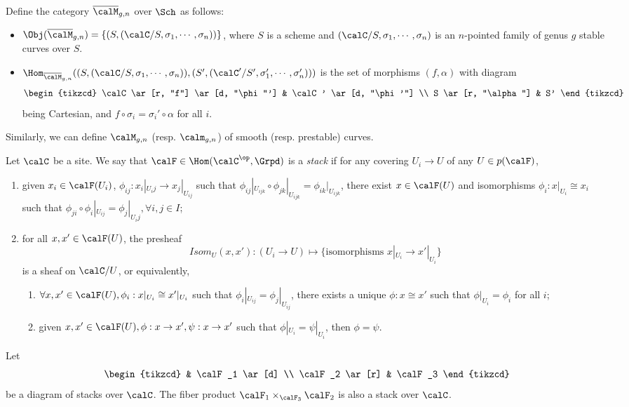     \begin{definition}
        Define the category $\overline{\calM}_{g,n}$ over $\Sch$ as follows:
        \begin{itemize}
            \item \(\Obj(\overline{\calM}_{g,n}) = \{(S, (\calC/S, \sigma_1,\cdots,\sigma_n))\}\), where $S$ is a scheme and $(\calC/S, \sigma_1,\cdots,\sigma_n)$ is an $n$-pointed family of genus $g$ stable curves over $S$.
            \item \(\Hom_{\overline{\calM}_{g,n}}((S, (\calC/S, \sigma_1,\cdots,\sigma_n)), (S', (\calC'/S', \sigma_1',\cdots,\sigma_n')))\) is the set of morphisms $(f,\alpha)$ with diagram 
            \[\begin{tikzcd}
                \calC \ar[r, "f"] \ar[d, "\phi"']  & \calC' \ar[d, "\phi'"] \\
                S \ar[r, "\alpha"] & S'
            \end{tikzcd}\]
            being Cartesian, and $f \circ \sigma_i = \sigma_i' \circ \alpha$ for all $i$.
        \end{itemize}
        Similarly, we can define $\calM_{g,n}$ (resp. $\calm_{g,n}$) of smooth (resp. prestable) curves.
    \end{definition}

    \begin{definition}
        Let $\calC$ be a site.
        We say that $\calF \in \Hom(\calC^\op, \Grpd)$ is a \emph{stack} if for any covering $U_i \to U$ of any $U \in p(\calF)$, 
        \begin{enumerate}
            \item given $x_i \in \calF(U_i)$, $\phi_{ij}:x_i|_{U_ij} \to x_j|_{U_{ij}}$ such that $\phi_{ij}|_{U_{ijk}} \circ \phi_{jk}|_{U_{ijk}} = \phi_{ik}|_{U_{ijk}}$,
                there exist $x \in \calF(U)$ and isomorphisms $\phi_i:x|_{U_i} \cong x_i$ such that $\phi_{ji} \circ \phi_i|_{U_{ij}} = \phi_j|_{U_ij}, \forall i,j \in I$;
            \item for all $x,x' \in \calF(U)$, the presheaf 
                \[ Isom_{U}(x,x'): (U_i \to U) \mapsto \{ \text{isomorphisms } x|_{U_i} \to x'|_{U_i} \} \]
                is a sheaf on $\calC/U$,
                or equivalently, 
                \begin{enumerate}
                    \item $\forall x,x' \in \calF(U), \phi_i: x|_{U_i} \cong x'|_{U_i}$ such that $\phi_i|_{U_{ij}} = \phi_j|_{U_{ij}}$, there exists a unique $\phi:x \cong x'$ such that $\phi|_{U_i} = \phi_i$ for all $i$;
                    \item given $x,x' \in \calF(U), \phi:x \to x', \psi:x \to x'$ such that $\phi|_{U_i} = \psi|_{U_i}$, then $\phi = \psi$.
                \end{enumerate}
        \end{enumerate}
    \end{definition}

    Let 
    \[ \begin{tikzcd}
        & \calF_1 \ar[d] \\
        \calF_2 \ar[r] & \calF_3
    \end{tikzcd} \]
    be a diagram of stacks over $\calC$.
    The fiber product $\calF_1 \times_{\calF_3} \calF_2$ is also a stack over $\calC$.



